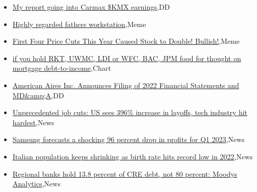 \documentclass{article}%
\begin{document}
%
\begin{itemize}%
\item%
\href{https://reddit.com/r/wallstreetbets/comments/12fcihd/my\_report\_going\_into\_carmax\_kmx\_earnings/}{My report going into Carmax \$KMX earnings},DD%
\item%
\href{https://reddit.com/r/wallstreetbets/comments/12fbafo/highly\_regarded\_fathers\_workstation/}{Highly regarded fathers workstation},Meme%
\item%
\href{https://reddit.com/r/wallstreetbets/comments/12f430b/first\_four\_price\_cuts\_this\_year\_caused\_stock\_to/}{First Four Price Cuts This Year Caused Stock to Double! Bullish!},Meme%
\item%
\href{https://reddit.com/r/wallstreetbets/comments/12f2zxl/if\_you\_hold\_rkt\_uwmc\_ldi\_or\_wfc\_bac\_jpm\_food\_for/}{if you hold RKT, UWMC, LDI or WFC, BAC, JPM food for thought on mortgage debt-to-income},Chart%
\item%
\href{https://reddit.com/r/Baystreetbets/comments/12ela9w/american\_aires\_inc\_announces\_filing\_of\_2022/}{American Aires Inc. Announces Filing of 2022 Financial Statements and MD\&amp;A},DD%
\item%
\href{https://reddit.com/r/StockMarket/comments/12fdsxa/unprecedented\_job\_cuts\_us\_sees\_396\_increase\_in/}{Unprecedented job cuts: US sees 396\% increase in layoffs, tech industry hit hardest},News%
\item%
\href{https://reddit.com/r/Economics/comments/12f7hs2/samsung\_forecasts\_a\_shocking\_96\_percent\_drop\_in/}{Samsung forecasts a shocking 96 percent drop in profits for Q1 2023},News%
\item%
\href{https://reddit.com/r/Economics/comments/12f38g7/italian\_population\_keeps\_shrinking\_as\_birth\_rate/}{Italian population keeps shrinking as birth rate hits record low in 2022},News%
\item%
\href{https://reddit.com/r/Economics/comments/12eygye/regional\_banks\_hold\_138\_percent\_of\_cre\_debt\_not/}{Regional banks hold 13.8 percent of CRE debt, not 80 percent: Moodys Analytics},News%
\end{itemize}%
\end{document}
